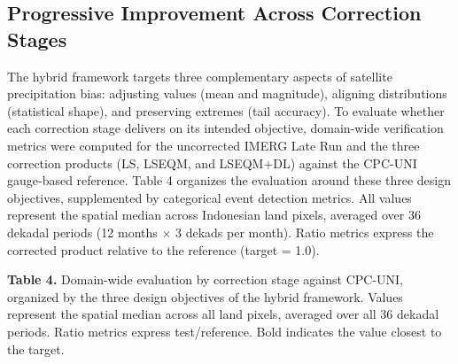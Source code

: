 \documentclass[remotesensing,article,submit,pdftex,moreauthors]{Definitions/mdpi}
\begin{document}
\subsection{Progressive Improvement Across Correction
Stages}

The hybrid framework targets three complementary aspects of satellite
precipitation bias: adjusting values (mean and magnitude), aligning
distributions (statistical shape), and preserving extremes (tail
accuracy). To evaluate whether each correction stage delivers on its
intended objective, domain-wide verification metrics were computed for
the uncorrected IMERG Late Run and the three correction products (LS,
LSEQM, and LSEQM+DL) against the CPC-UNI gauge-based reference. Table 4
organizes the evaluation around these three design objectives,
supplemented by categorical event detection metrics. All values
represent the spatial median across Indonesian land pixels, averaged
over 36 dekadal periods (12 months \(\times\) 3 dekads per month). Ratio
metrics express the corrected product relative to the reference (target
= 1.0).

\textbf{Table 4.} Domain-wide evaluation by correction stage against
CPC-UNI, organized by the three design objectives of the hybrid
framework. Values represent the spatial median across all land pixels,
averaged over all 36 dekadal periods. Ratio metrics express
test/reference. Bold indicates the value closest to the target.
\end{document}
